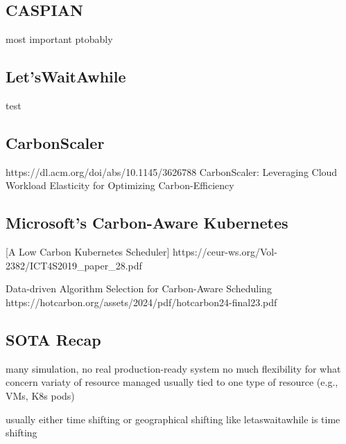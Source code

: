 \subsection{CASPIAN}

most important ptobably

\subsection{Let'sWaitAwhile}

test

\subsection{CarbonScaler}

https://dl.acm.org/doi/abs/10.1145/3626788
CarbonScaler: Leveraging Cloud Workload Elasticity for Optimizing Carbon-Efficiency

\subsection{Microsoft's Carbon-Aware Kubernetes}



[A Low Carbon Kubernetes Scheduler]
https://ceur-ws.org/Vol-2382/ICT4S2019_paper_28.pdf

Data-driven Algorithm Selection for Carbon-Aware Scheduling
https://hotcarbon.org/assets/2024/pdf/hotcarbon24-final23.pdf

\subsection{SOTA Recap}

many simulation, 
no real production-ready system
no much flexibility for what concern variaty of resource managed
usually tied to one type of resource (e.g., VMs, K8s pods)



usually either time shifting or geographical shifting
like letaswaitawhile is time shifting


\newpage
